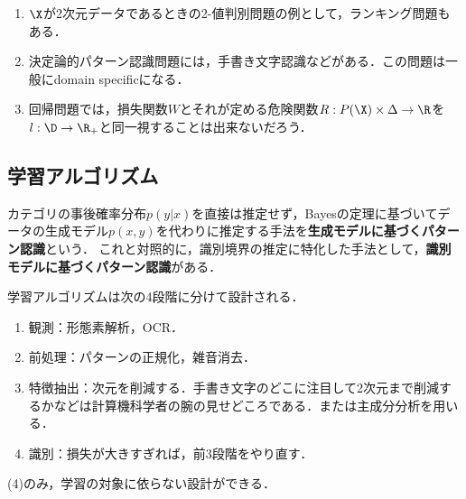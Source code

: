 \documentclass[uplatex,dvipdfmx]{jsreport}
\begin{document}
\begin{example}\mbox{}
    \begin{enumerate}
        \item $\X$が2次元データであるときの2-値判別問題の例として，ランキング問題もある．
        \item 決定論的パターン認識問題には，手書き文字認識などがある．この問題は一般にdomain specificになる．
        \item 回帰問題では，損失関数$W$とそれが定める危険関数$R:P(\X)\times\Delta\to\R$を$l:\D\to\R_+$と同一視することは出来ないだろう．
    \end{enumerate}
\end{example}

\subsection{学習アルゴリズム}

\begin{tcolorbox}[colframe=ForestGreen, colback=ForestGreen!10!white,breakable,colbacktitle=ForestGreen!40!white,coltitle=black,fonttitle=\bfseries\sffamily,
title=]
    カテゴリの事後確率分布$p(y|x)$を直接は推定せず，Bayesの定理に基づいてデータの生成モデル$p(x,y)$を代わりに推定する手法を\textbf{生成モデルに基づくパターン認識}という．
    これと対照的に，識別境界の推定に特化した手法として，\textbf{識別モデルに基づくパターン認識}がある．
\end{tcolorbox}

\begin{model}
    学習アルゴリズムは次の4段階に分けて設計される．
    \begin{enumerate}
        \item 観測：形態素解析，OCR．
        \item 前処理：パターンの正規化，雑音消去．
        \item 特徴抽出：次元を削減する．手書き文字のどこに注目して2次元まで削減するかなどは計算機科学者の腕の見せどころである．または主成分分析を用いる．
        \item 識別：損失が大きすぎれば，前3段階をやり直す．
    \end{enumerate}
    (4)のみ，学習の対象に依らない設計ができる．
\end{model}
\end{document}
